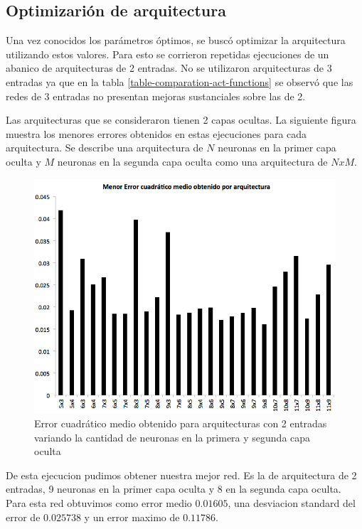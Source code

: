 \documentclass[a4paper,10pt]{article}
\begin{document}
    \subsection{Optimizarión de arquitectura}
    \label{sec:arquitectura-optima}

    Una vez conocidos los parámetros óptimos, se buscó optimizar la arquitectura utilizando estos valores.
    Para esto se corrieron repetidas ejecuciones de un abanico de arquitecturas de 2 entradas.
    No se utilizaron arquitecturas de 3 entradas ya que en la tabla \ref{table-comparation-act-functions} se observó que las redes de 3 entradas no presentan mejoras sustanciales sobre las de 2.

    Las arquitecturas que se consideraron tienen 2 capas ocultas.
    La siguiente figura muestra los menores errores obtenidos en estas
    ejecuciones para cada arquitectura. Se describe una arquitectura de $N$
    neuronas en la primer capa oculta y $M$ neuronas en la segunda capa oculta
    como una arquitectura de $NxM$.

    \begin{figure}[H]
        \includegraphics[scale=0.5]{./images/arquitecturas.png}
        \caption{Error cuadrático medio obtenido para arquitecturas con 2 entradas variando la cantidad de neuronas en la primera y segunda capa oculta}
        \label{fig:arquitecturas}
    \end{figure}

    De esta ejecucion pudimos obtener nuestra mejor red.
    Es la de arquitectura de 2 entradas, 9 neuronas en la primer capa oculta y 8 en la segunda capa oculta.
    Para esta red obtuvimos como error medio $0.01605$, una desviacion standard del error de $0.025738$ y un error maximo de $0.11786$.


\end{document}
